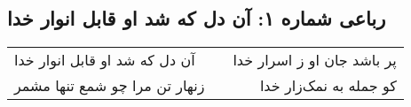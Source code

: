 \begin{center}
\section*{رباعی شماره ۱: آن دل که شد او قابل انوار خدا}
\label{sec:0001}
\begin{longtable}{l p{0.5cm} r}
آن دل که شد او قابل انوار خدا
&&
پر باشد جان او ز اسرار خدا
\\
زنهار تن مرا چو شمع تنها مشمر
&&
کو جمله به نمک‌زار خدا
\\
\end{longtable}
\end{center}
